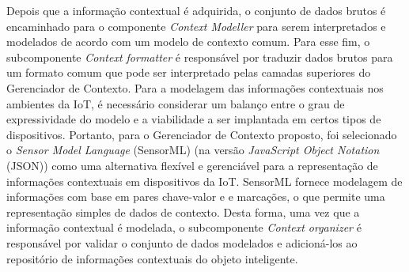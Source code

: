 \documentclass[tid,table]{texufpel} %
\begin{document}
Depois que a informação contextual é adquirida, o conjunto de dados brutos é encaminhado para o componente \textit{Context Modeller} para serem interpretados e modelados de acordo com um modelo de contexto comum. Para esse fim, o subcomponente  \textit{Context formatter} é responsável por traduzir dados brutos para um formato comum que pode ser interpretado pelas camadas superiores do Gerenciador de Contexto. Para a modelagem das informações contextuais nos ambientes da IoT, é necessário considerar um balanço entre o grau de expressividade do modelo e a viabilidade a ser implantada em certos tipos de dispositivos. 
Portanto, para o Gerenciador de Contexto proposto, foi selecionado o \textit{Sensor Model Language} (SensorML) \cite{ocg18} (na versão \textit{JavaScript Object Notation} (JSON)) como uma alternativa flexível e gerenciável para a representação de informações contextuais em dispositivos da IoT. SensorML fornece modelagem de informações com base em pares chave-valor e e marcações, o que permite uma representação simples de dados de contexto. Desta forma, uma vez que a informação contextual é modelada, o subcomponente \textit{Context organizer} é responsável por validar o conjunto de dados modelados e adicioná-los ao repositório de informações contextuais do objeto inteligente.
\end{document}
